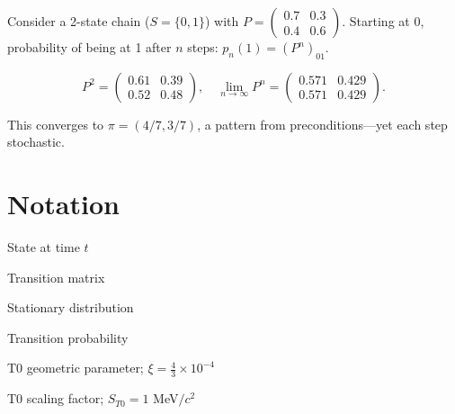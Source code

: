 	Consider a 2-state chain ($S = \{0,1\}$) with $P = \begin{pmatrix} 0.7 & 0.3 \\ 0.4 & 0.6 \end{pmatrix}$. Starting at 0, probability of being at 1 after $n$ steps: $p_n(1) = (P^n)_{01}$.
	
	\begin{equation}
		P^2 = \begin{pmatrix} 0.61 & 0.39 \\ 0.52 & 0.48 \end{pmatrix}, \quad \lim_{n\to\infty} P^n = \begin{pmatrix} 0.571 & 0.429 \\ 0.571 & 0.429 \end{pmatrix}.
	\end{equation}
	
	This converges to $\pi = (4/7, 3/7)$, a pattern from preconditions—yet each step stochastic.
	
	\section{Notation}
	
	\begin{description}[leftmargin=1cm]
		\item[$X_t$] State at time $t$
		\item[$P$] Transition matrix
		\item[$\pi$] Stationary distribution
		\item[$p_{ij}$] Transition probability
		\item[$\xi$] T0 geometric parameter; $\xi = \frac{4}{3} \times 10^{-4}$
		\item[$S_{T0}$] T0 scaling factor; $S_{T0} = 1$ MeV$/c^2$
	\end{description}
	
	\begin{center}
	\end{center}
